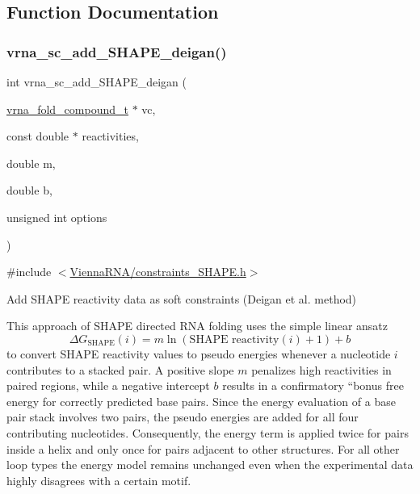 \subsection{Function Documentation}
\mbox{\label{group__SHAPE__reactivities_ga57d612b58e1c61dd6cfcb5a843f8f1b3}} 
\subsubsection{\texorpdfstring{vrna\+\_\+sc\+\_\+add\+\_\+\+S\+H\+A\+P\+E\+\_\+deigan()}{vrna\_sc\_add\_SHAPE\_deigan()}}
{\footnotesize\ttfamily int vrna\+\_\+sc\+\_\+add\+\_\+\+S\+H\+A\+P\+E\+\_\+deigan (\begin{DoxyParamCaption}\item[{\hyperlink{group__fold__compound_ga1b0cef17fd40466cef5968eaeeff6166}{vrna\+\_\+fold\+\_\+compound\+\_\+t} $\ast$}]{vc,  }\item[{const double $\ast$}]{reactivities,  }\item[{double}]{m,  }\item[{double}]{b,  }\item[{unsigned int}]{options }\end{DoxyParamCaption})}



{\ttfamily \#include $<$\hyperlink{constraints__SHAPE_8h}{Vienna\+R\+N\+A/constraints\+\_\+\+S\+H\+A\+P\+E.\+h}$>$}



Add S\+H\+A\+PE reactivity data as soft constraints (Deigan et al. method) 

This approach of S\+H\+A\+PE directed R\+NA folding uses the simple linear ansatz \[ \Delta G_{\text{SHAPE}}(i) = m \ln(\text{SHAPE reactivity}(i)+1)+ b \] to convert S\+H\+A\+PE reactivity values to pseudo energies whenever a nucleotide $ i $ contributes to a stacked pair. A positive slope $ m $ penalizes high reactivities in paired regions, while a negative intercept $ b $ results in a confirmatory ``bonus\textquotesingle{}\textquotesingle{} free energy for correctly predicted base pairs. Since the energy evaluation of a base pair stack involves two pairs, the pseudo energies are added for all four contributing nucleotides. Consequently, the energy term is applied twice for pairs inside a helix and only once for pairs adjacent to other structures. For all other loop types the energy model remains unchanged even when the experimental data highly disagrees with a certain motif.

